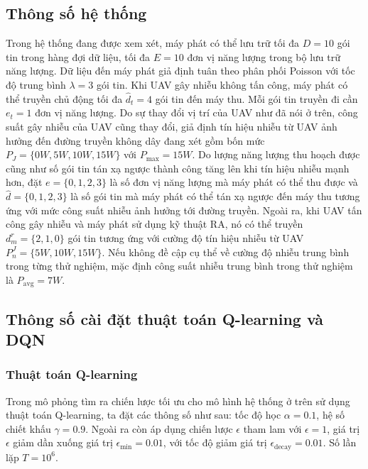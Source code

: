 \documentclass{uetgraduation}
\begin{document}
\subsection{Thông số hệ thống}
Trong hệ thống đang được xem xét, máy phát có thể lưu trữ tối đa $D = 10$ gói tin trong hàng đợi dữ liệu, tối đa $E = 10$ đơn vị năng lượng
trong bộ lưu trữ năng lượng. Dữ liệu đến máy phát giả định tuân theo phân phối Poisson với tốc độ trung bình $\lambda = 3$ 
gói tin. Khi UAV gây nhiễu không tấn công, máy phát có thể truyền chủ động tối đa $\hat{d}_t = 4$ gói tin đến máy thu. Mỗi gói tin truyền đi cần
$e_t = 1$ đơn vị năng lượng. Do sự thay đổi vị trí của UAV như đã nói ở trên, công suất gây nhiễu của UAV cũng thay đổi, giả định tín hiệu nhiễu từ 
UAV ảnh hưởng đến đường truyền không dây đang xét gồm bốn mức $P_J = \{0W, 5W, 10W, 15W\}$ với $P_{\text{max}} = 15W$. Do lượng năng lượng
thu hoạch được cũng như số gói tin tán xạ ngược thành công tăng lên khi tín hiệu nhiễu mạnh hơn, đặt $e = \{0, 1, 2, 3\}$ là số đơn vị
năng lượng mà máy phát có thể thu được và $\hat{d} = \{0, 1, 2, 3\}$ là số gói tin mà máy phát có thể tán xạ ngược đến máy thu tương ứng với mức công suất nhiễu
ảnh hưởng tới đường truyền. Ngoài ra, khi UAV tấn công gây nhiễu và máy phát sử dụng kỹ thuật RA, nó có thể truyền $d^r_m = \{2, 1, 0\}$ gói tin
tương ứng với cường độ tín hiệu nhiễu từ UAV $P^J_n = \{5W, 10W, 15W\}$. Nếu không đề cập cụ thể về cường độ nhiễu trung bình trong từng thử nghiệm, mặc định
công suất nhiễu trung bình trong thử nghiệm là $P_\text{avg} = 7W$.

\subsection{Thông số cài đặt thuật toán Q-learning và DQN}
\subsubsection{Thuật toán Q-learning}
Trong mô phỏng tìm ra chiến lược tối ưu cho mô hình hệ thống ở trên sử dụng thuật toán Q-learning, ta đặt các thông số như sau: tốc độ học $\alpha = 0.1$,
hệ số chiết khấu $\gamma = 0.9$. Ngoài ra còn áp dụng chiến lược $\epsilon$ tham lam với $\epsilon = 1$, giá trị $\epsilon$ giảm dần xuống giá trị $\epsilon_\text{min} = 0.01$,
với tốc độ giảm giá trị $\epsilon_\text{decay} = 0.01$. Số lần lặp $T = 10^6$.
\end{document}
